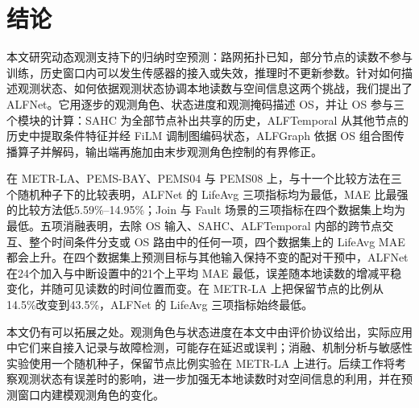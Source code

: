 \section{结论}\label{sec:conclusion}
本文研究动态观测支持下的归纳时空预测：路网拓扑已知，部分节点的读数不参与训练，历史窗口内可以发生传感器的接入或失效，推理时不更新参数。针对如何描述观测状态、如何依据观测状态协调本地读数与空间信息这两个挑战，我们提出了 ALFNet。它用逐步的观测角色、状态进度和观测掩码描述 OS，并让 OS 参与三个模块的计算：SAHC 为全部节点补出共享的历史，ALFTemporal 从其他节点的历史中提取条件特征并经 FiLM 调制图编码状态，ALFGraph 依据 OS 组合图传播算子并解码，输出端再施加由末步观测角色控制的有界修正。

在 METR-LA、PEMS-BAY、PEMS04 与 PEMS08 上，与十一个比较方法在三个随机种子下的比较表明，ALFNet 的 LifeAvg 三项指标均为最低，MAE 比最强的比较方法低5.59\%–14.95\%；Join 与 Fault 场景的三项指标在四个数据集上均为最低。五项消融表明，去除 OS 输入、SAHC、ALFTemporal 内部的跨节点交互、整个时间条件分支或 OS 路由中的任何一项，四个数据集上的 LifeAvg MAE 都会上升。在四个数据集上预测目标与其他输入保持不变的配对干预中，ALFNet 在24个加入与中断设置中的21个上平均 MAE 最低，误差随本地读数的增减平稳变化，并随可见读数的时间位置而变。在 METR-LA 上把保留节点的比例从14.5\%改变到43.5\%，ALFNet 的 LifeAvg 三项指标始终最低。

本文仍有可以拓展之处。观测角色与状态进度在本文中由评价协议给出，实际应用中它们来自接入记录与故障检测，可能存在延迟或误判；消融、机制分析与敏感性实验使用一个随机种子，保留节点比例实验在 METR-LA 上进行。后续工作将考察观测状态有误差时的影响，进一步加强无本地读数时对空间信息的利用，并在预测窗口内建模观测角色的变化。
